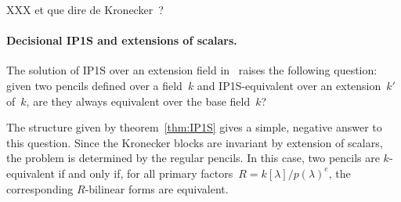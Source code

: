 \documentclass{lms}
\begin{document}
XXX et que dire de Kronecker ?


\paragraph{Decisional IP1S and extensions of scalars.}

The solution of IP1S over an extension field
in~\cite{DBLP:journals/corr/BerthomieuFP13} raises the following
question: given two pencils defined over a field~$k$
and IP1S-equivalent over an extension~$k'$ of~$k$, are they always
equivalent over the base field~$k$?

The structure given by theorem~\ref{thm:IP1S}
gives a simple, negative answer to this question.
Since the Kronecker blocks are invariant by extension of scalars,
the problem is determined by the regular pencils.
In this case, two pencils are $k$-equivalent
if and only if, for all primary factors~$R =k[λ]/p(λ)^e$,
the corresponding $R$-bilinear forms are equivalent.

% 
\end{document}

